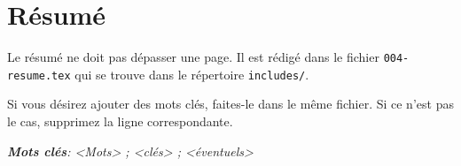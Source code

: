 
\newpage

\section*{Résumé} %
  
Le résumé ne doit pas dépasser une page. Il est rédigé dans le fichier \texttt{004-resume.tex} qui se trouve dans le répertoire \texttt{includes/}.

Si vous désirez ajouter des mots clés, faites-le dans le même fichier. Si ce n'est pas le cas, supprimez la ligne correspondante.

\bigskip

\textbf{\emph{Mots clés}}\emph{: <Mots> ; <clés> ; <éventuels>}


